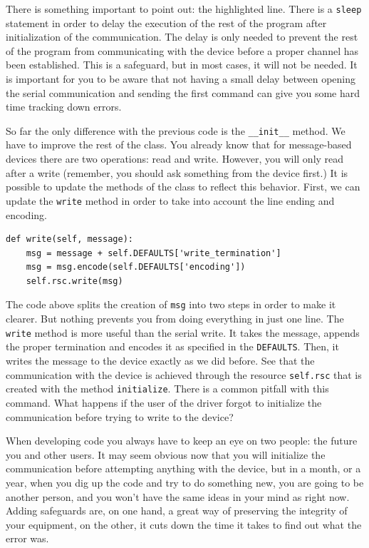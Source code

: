 There is something important to point out: the highlighted line. There
is a \texttt{sleep} statement in order to delay the execution of the
rest of the program after initialization of the communication. The delay
is only needed to prevent the rest of the program from communicating
with the device before a proper channel has been established. This is a
safeguard, but in most cases, it will not be needed. It is important for you
to be aware that not having a small delay between opening the serial
communication and sending the first command can give you some hard time
tracking down errors.

So far the only difference with the previous code is the
\texttt{__init__} method. We have to improve the
rest of the class. You already know that for message-based devices there are two
operations: read and write. However, you will only read after a write
(remember, you should ask something from the device first.) It is
possible to update the methods of the class to reflect this behavior.
First, we can update the \texttt{write} method in order to take into account the line ending
and encoding.

\begin{verbatim}
def write(self, message):
    msg = message + self.DEFAULTS['write_termination']
    msg = msg.encode(self.DEFAULTS['encoding'])
    self.rsc.write(msg)
\end{verbatim}

The code above splits the creation of \texttt{msg} into two steps in order to make it clearer. But nothing prevents you from doing everything in just one line. The \texttt{write} method is more useful than the serial write. It takes
the message, appends the proper termination and encodes it as specified in the \texttt{DEFAULTS}. Then, it writes the message to the
device exactly as we did before. See that the communication with the device is achieved
through the resource \texttt{self.rsc} that is created with the method
\texttt{initialize}. There is a common pitfall with this command. What
happens if the user of the driver forgot to initialize the communication
before trying to write to the device?


When developing code you always have to
keep an eye on two people: the future you and other users. It may seem
obvious now that you will initialize the communication before attempting
anything with the device, but in a month, or a year, when you dig up the
code and try to do something new, you are going to be another person,
and you won't have the same ideas in your mind as right now. Adding
safeguards are, on one hand, a great way of preserving the integrity of
your equipment, on the other, it cuts down the time it takes to find out
what the error was.

